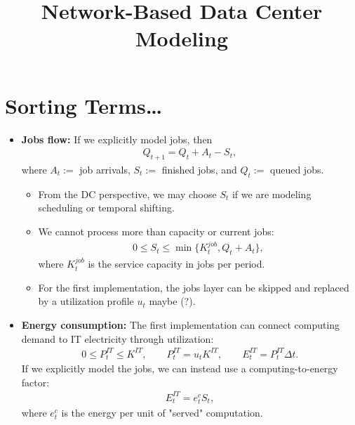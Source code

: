 \documentclass{article}
\title{Network-Based Data Center Modeling}
\author{}
\date{}
\begin{document}
\maketitle


\section{Sorting Terms\ldots}

\begin{itemize}
    \item \textbf{Jobs flow:} If we explicitly model jobs, then
    \begin{align*}
        Q_{t+1}=Q_t + A_t - S_t,
    \end{align*}
    where $A_t:=$ job arrivals, $S_t:=$ finished jobs, and $Q_t:=$ queued jobs.
    \begin{itemize}
        \item From the DC perspective, we may choose $S_t$ if we are modeling scheduling or temporal shifting.
        \item We cannot process more than capacity or current jobs:
        \begin{align*}
            0\leq S_t \leq \min\{K_t^{job}, Q_t + A_t\},
        \end{align*}
        where $K_t^{job}$ is the service capacity in jobs per period.
        \item For the first implementation, the jobs layer can be skipped and replaced by a utilization profile $u_t$ maybe (?). 
    \end{itemize}

    \item \textbf{Energy consumption:} The first implementation can connect computing demand to IT electricity through utilization:
    \begin{align*}
        0\leq P_t^{IT}\leq K^{IT},
        \qquad
        P_t^{IT}=u_tK^{IT},
        \qquad
        E_t^{IT}=P_t^{IT}\Delta t.
    \end{align*}
    If we explicitly model the jobs, we can instead use a computing-to-energy factor:
    \begin{align*}
        E_t^{IT}=e_t^c S_t,
    \end{align*}
    where $e_t^c$ is the energy per unit of "served" computation.  


\end{itemize}
\end{document}
